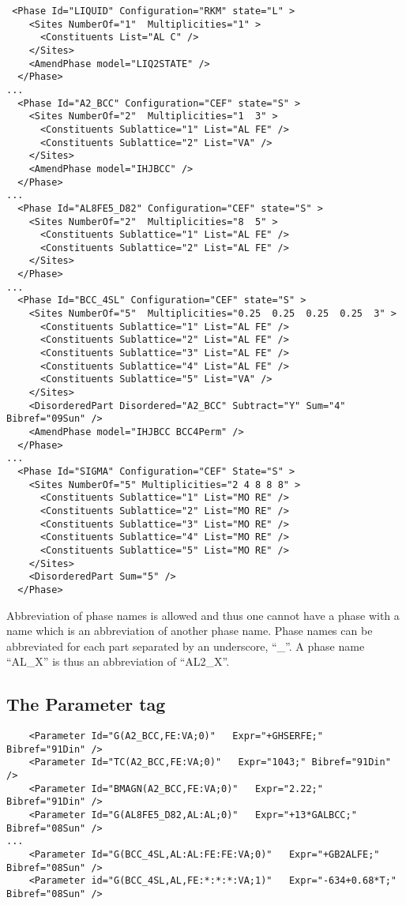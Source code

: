 \documentclass{article}
\begin{document}
\begin{appendices}
{\small
\begin{verbatim}
 <Phase Id="LIQUID" Configuration="RKM" state="L" >
    <Sites NumberOf="1"  Multiplicities="1" >
      <Constituents List="AL C" />
    </Sites>
    <AmendPhase model="LIQ2STATE" />
  </Phase>
...
  <Phase Id="A2_BCC" Configuration="CEF" state="S" >
    <Sites NumberOf="2"  Multiplicities="1  3" >
      <Constituents Sublattice="1" List="AL FE" />
      <Constituents Sublattice="2" List="VA" />
    </Sites>
    <AmendPhase model="IHJBCC" />
  </Phase>
...
  <Phase Id="AL8FE5_D82" Configuration="CEF" state="S" >
    <Sites NumberOf="2"  Multiplicities="8  5" >
      <Constituents Sublattice="1" List="AL FE" />
      <Constituents Sublattice="2" List="AL FE" />
    </Sites>
  </Phase>
...
  <Phase Id="BCC_4SL" Configuration="CEF" state="S" >
    <Sites NumberOf="5"  Multiplicities="0.25  0.25  0.25  0.25  3" >
      <Constituents Sublattice="1" List="AL FE" />
      <Constituents Sublattice="2" List="AL FE" />
      <Constituents Sublattice="3" List="AL FE" />
      <Constituents Sublattice="4" List="AL FE" />
      <Constituents Sublattice="5" List="VA" />
    </Sites>
    <DisorderedPart Disordered="A2_BCC" Subtract="Y" Sum="4" Bibref="09Sun" />
    <AmendPhase model="IHJBCC BCC4Perm" />
  </Phase>
...
  <Phase Id="SIGMA" Configuration="CEF" State="S" >
    <Sites NumberOf="5" Multiplicities="2 4 8 8 8" >
      <Constituents Sublattice="1" List="MO RE" />
      <Constituents Sublattice="2" List="MO RE" />
      <Constituents Sublattice="3" List="MO RE" />
      <Constituents Sublattice="4" List="MO RE" />
      <Constituents Sublattice="5" List="MO RE" />
    </Sites>
    <DisorderedPart Sum="5" />
  </Phase>
\end{verbatim}
}

Abbreviation of phase names is allowed and thus one cannot have a phase
with a name which is an abbreviation of another phase name.  Phase
names can be abbreviated for each part separated by an underscore,
``\_''.  A phase name ``AL\_X'' is thus an abbreviation of ``AL2\_X''.

\newpage 

\subsection{The Parameter tag}\label{sec:parameter examples}

{\small
\begin{verbatim}
    <Parameter Id="G(A2_BCC,FE:VA;0)"   Expr="+GHSERFE;" Bibref="91Din" />
    <Parameter Id="TC(A2_BCC,FE:VA;0)"   Expr="1043;" Bibref="91Din" />
    <Parameter Id="BMAGN(A2_BCC,FE:VA;0)"   Expr="2.22;" Bibref="91Din" />
    <Parameter Id="G(AL8FE5_D82,AL:AL;0)"   Expr="+13*GALBCC;" Bibref="08Sun" />
...
    <Parameter Id="G(BCC_4SL,AL:AL:FE:FE:VA;0)"   Expr="+GB2ALFE;" Bibref="08Sun" />
    <Parameter id="G(BCC_4SL,AL,FE:*:*:*:VA;1)"   Expr="-634+0.68*T;" Bibref="08Sun" />
\end{verbatim}
}


\end{appendices}
\end{document}
